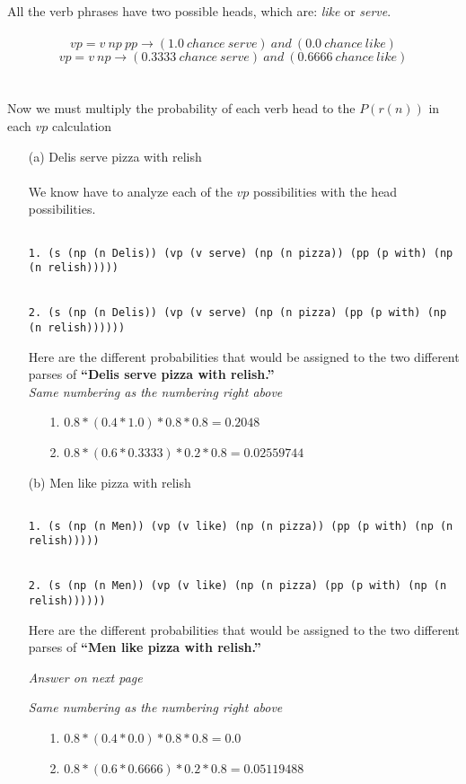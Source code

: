 \documentclass[ruled]{article}
\begin{document}
All the verb phrases have two possible heads, which are:
\textit{like} or \textit{serve}.
\\ \\ 
$$vp = v\ np\ pp \rightarrow (1.0\ chance\ serve)\ and\ (0.0\ chance\ like) $$ 
$$vp = v\ np \rightarrow (0.3333 \ chance\ serve)\ and\ (0.6666 \ chance\ like) $$ 
\\ \\
Now we must multiply the probability of each verb head to the $P(r(n))$ in each $vp$ calculation
\begin{itemize}
\item[(a)]  Delis serve pizza with relish
\\ \\
We know have to analyze each of the $vp$ possibilities with the head possibilities.

\begin{verbatim}

1. (s (np (n Delis)) (vp (v serve) (np (n pizza)) (pp (p with) (np (n relish)))))


2. (s (np (n Delis)) (vp (v serve) (np (n pizza) (pp (p with) (np (n relish))))))

\end{verbatim}
Here are the different probabilities that would be assigned to the two different parses of \textbf{“Delis serve pizza with relish.”}\\  
\textit{Same numbering as the numbering right above}\\
\begin{itemize}
\item[1. ] $0.8 * (0.4 * 1.0) * 0.8 * 0.8 = 0.2048$
\item[2. ] $0.8 * (0.6 *0.3333) * 0.2 * 0.8 = 0.02559744$
\end{itemize}

\item[(b)]  Men like pizza with relish
\begin{verbatim}

1. (s (np (n Men)) (vp (v like) (np (n pizza)) (pp (p with) (np (n relish)))))


2. (s (np (n Men)) (vp (v like) (np (n pizza) (pp (p with) (np (n relish))))))

\end{verbatim}
Here are the different probabilities that would be assigned to the two different parses of \textbf{“Men like	 pizza with relish.”}\\  
\begin{center}


\textit{Answer on next page}\\
\end{center}
\newpage
\textit{Same numbering as the numbering right above}\\
\begin{itemize}
\item[1. ] $0.8 * (0.4 * 0.0) * 0.8 * 0.8 = 0.0$
\item[2. ] $0.8 * (0.6 *0.6666) * 0.2 * 0.8 = 0.05119488$
\end{itemize}
\end{itemize}
\end{document}
